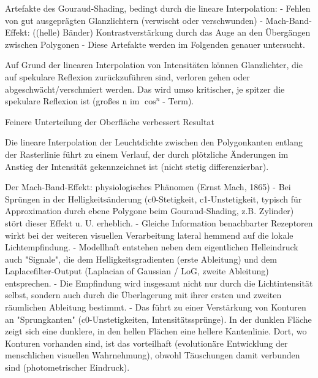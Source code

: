 \documentclass[10pt,landscape]{article}
\begin{document}
\begin{multicols}{3}
  
  Artefakte des Gouraud-Shading, bedingt durch die lineare Interpolation:
  - Fehlen von gut ausgeprägten Glanzlichtern (verwischt oder verschwunden)
  - Mach-Band-Effekt: ((helle) Bänder) Kontrastverstärkung durch das Auge an den Übergängen zwischen Polygonen
  - Diese Artefakte werden im Folgenden genauer untersucht.
  
  Auf Grund der linearen Interpolation von Intensitäten können Glanzlichter, die auf spekulare Reflexion zurückzuführen sind, verloren gehen oder abgeschwächt/verschmiert werden. Das wird umso kritischer, je spitzer die spekulare Reflexion ist (großes n im $\cos^n$- Term).
  
  Feinere Unterteilung der Oberfläche verbessert Resultat
  
  
  Die lineare Interpolation der Leuchtdichte zwischen den Polygonkanten entlang der Rasterlinie führt zu einem Verlauf, der durch plötzliche Änderungen im Anstieg der Intensität gekennzeichnet ist (nicht stetig differenzierbar).
  
  Der Mach-Band-Effekt: physiologisches Phänomen (Ernst Mach, 1865)
  - Bei Sprüngen in der Helligkeitsänderung (c0-Stetigkeit, c1-Unstetigkeit, typisch für Approximation durch ebene Polygone beim Gouraud-Shading, z.B. Zylinder) stört dieser Effekt u. U. erheblich.
  - Gleiche Information benachbarter Rezeptoren wirkt bei der weiteren visuellen Verarbeitung lateral hemmend auf die lokale Lichtempfindung.
  - Modellhaft entstehen neben dem eigentlichen Helleindruck auch "Signale", die dem Helligkeitsgradienten (erste Ableitung) und dem Laplacefilter-Output (Laplacian of Gaussian / LoG, zweite Ableitung) entsprechen.
  - Die Empfindung wird insgesamt nicht nur durch die Lichtintensität selbst, sondern auch durch die Überlagerung mit ihrer ersten und zweiten räumlichen Ableitung bestimmt.
  - Das führt zu einer Verstärkung von Konturen an "Sprungkanten" (c0-Unstetigkeiten, Intensitätssprünge). In der dunklen Fläche zeigt sich eine dunklere, in den hellen Flächen eine hellere Kantenlinie. Dort, wo Konturen vorhanden sind, ist das vorteilhaft (evolutionäre Entwicklung der menschlichen visuellen Wahrnehmung), obwohl Täuschungen damit verbunden sind (photometrischer Eindruck).
  

\end{multicols}
\end{document}
